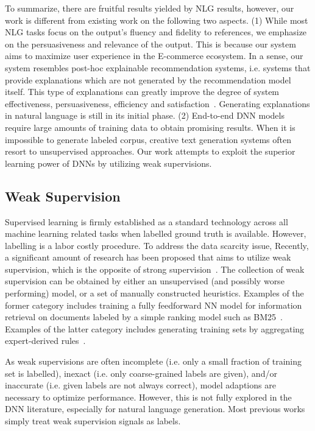 \documentclass[sigconf]{acmart}
\begin{document}
To summarize, there are fruitful results yielded by NLG results, however, our work is different from existing work on the following two aspects. (1) While most NLG tasks focus on the output's fluency and fidelity to references, we emphasize on the persuasiveness and relevance of the output.  This is because our system aims to maximize user experience in the E-commerce ecosystem. In a sense, our system resembles post-hoc explainable recommendation systems, i.e.  systems that provide explanations which are not generated by the recommendation model itself. This type of explanations can greatly improve the degree of system effectiveness, persuasiveness, efficiency and satisfaction~\cite{Tintarev2011Designing}. Generating explanations in natural language is still in its initial phase. (2) End-to-end DNN models require large amounts of training data to obtain promising results. When it is impossible to generate labeled corpus, creative text generation systems often resort to unsupervised approaches. Our work attempts to exploit the superior learning power of DNNs by utilizing weak supervisions.

\subsection{Weak Supervision}
Supervised learning is firmly established as a standard technology across all machine learning related tasks when labelled ground truth is available. However, labelling is a labor costly procedure. To address the data scarcity issue, Recently, a significant amount of research has been proposed that aims to utilize weak supervision, which is the opposite of strong supervision~\cite{Zhou2018brief}. The collection of weak supervision can be obtained by either an unsupervised (and possibly worse performing) model, or a set of manually constructed heuristics. Examples of the former category includes training a fully feedforward NN model for information retrieval on documents labeled by a simple ranking model such as BM25~\cite{Dehghani2017Neural}. Examples of the latter category includes generating training sets by aggregating expert-derived rules~\cite{ratner2017snorkel}. 

As weak supervisions are often 
incomplete (i.e. only a small fraction of training set is labelled), inexact (i.e. only coarse-grained labels are given), and/or inaccurate (i.e. given labels are not always correct), model adaptions are necessary to optimize performance. However, this is not fully explored in the DNN literature, especially for natural language generation. Most previous works simply 
treat weak supervision signals as labels. 
\end{document}
